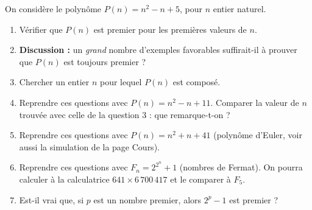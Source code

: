 On considère le polynôme $P(n) = n^2 - n + 5$, pour $n$ entier naturel.
\begin{enumerate}
  \item Vérifier que $P(n)$ est premier pour les premières valeurs de $n$.
  \item \textbf{Discussion :} un \emph{grand} nombre d'exemples favorables
  suffirait-il à prouver que $P(n)$ est toujours premier ?
  \item Chercher un entier $n$ pour lequel $P(n)$ est composé.
  \item Reprendre ces questions avec $P(n) = n^2 - n + 11$. Comparer la
  valeur de $n$ trouvée avec celle de la question 3 : que remarque-t-on ?
  \item Reprendre ces questions avec $P(n) = n^2 + n + 41$ (polynôme d'Euler,
  voir aussi la simulation de la page Cours).
  \item Reprendre ces questions avec $F_n = 2^{2^n} + 1$ (nombres de Fermat).
  On pourra calculer à la calculatrice $641 \times 6\,700\,417$ et le
  comparer à $F_5$.
  \item Est-il vrai que, si $p$ est un nombre premier, alors $2^p - 1$ est
  premier ?
\end{enumerate}
